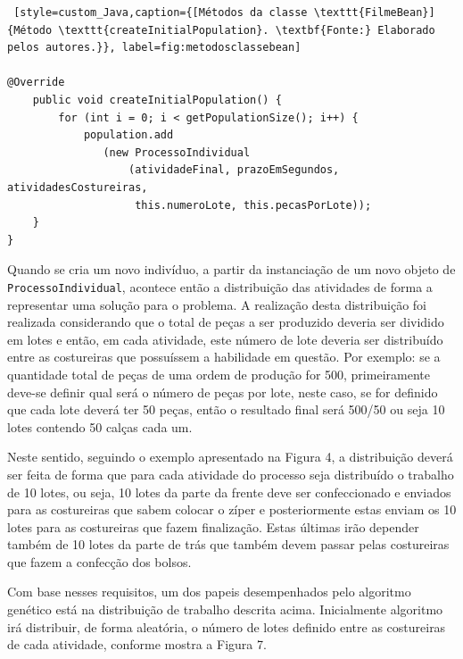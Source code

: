 \begin{lstlisting} [style=custom_Java,caption={[Métodos da classe \texttt{FilmeBean}]{Método \texttt{createInitialPopulation}. \textbf{Fonte:} Elaborado pelos autores.}}, label=fig:metodosclassebean] 	

@Override
	public void createInitialPopulation() {
		for (int i = 0; i < getPopulationSize(); i++) {
			population.add
			   (new ProcessoIndividual
			       (atividadeFinal, prazoEmSegundos, atividadesCostureiras,
			        this.numeroLote, this.pecasPorLote));
	}
}

\end{lstlisting}

\par Quando se cria um novo indivíduo, a partir da instanciação de um novo objeto de \texttt{ProcessoIndividual},
acontece então a distribuição das atividades de forma a representar uma solução para o problema.
A realização desta distribuição foi realizada considerando que o total de
peças a ser produzido deveria ser dividido em lotes e então, em cada atividade,
este número de lote deveria ser distribuído entre as costureiras que possuíssem a habilidade em questão. Por exemplo: se a quantidade total de peças de uma ordem de produção for 500,
primeiramente deve-se definir qual será o número de peças por lote, neste caso, se for definido que cada lote  
deverá ter 50 peças, então o resultado final será 500/50 ou seja 10 lotes contendo 50 calças cada um. 

\par Neste sentido, seguindo o exemplo apresentado  na Figura 4, a distribuição
deverá ser feita de forma que para cada atividade do processo seja distribuído o trabalho de 10 lotes, ou seja, 10 lotes da parte da frente deve ser confeccionado e enviados para as costureiras que sabem colocar
o zíper e posteriormente estas enviam os 10 lotes para as costureiras que fazem finalização. Estas últimas irão depender
também de 10 lotes da parte de trás que também devem passar pelas costureiras que fazem a confecção dos bolsos. 


\par Com base nesses requisitos, um dos papeis desempenhados pelo algoritmo genético está na distribuição de
trabalho descrita acima. Inicialmente algoritmo irá distribuir, de forma
aleatória, o número de lotes definido entre as costureiras de cada atividade,
conforme mostra a Figura 7.

